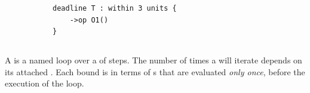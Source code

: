 \begin{figure}[H]
\begin{subfigure}[t]{\egtextwidth}
\begin{lstlisting}[style=Example]
deadline T : within 3 units {
    ->op O1()
}
\end{lstlisting}
\end{subfigure}
\hfill
\begin{subfigure}[t]{\eggraphicalwidth}
  \gsecaption
  \centering
\end{subfigure}
\end{figure}


\subsection{\mloopstep}\label{ssec:metamodel-steps-loop}

\newcommand{\egloopmatrix}{
  \node[rcmodule](mstart) {\egtarget}; \pgfmatrixnextcell \node[world](wstart) {\egworld}; \\
  \coordinate(mls); \pgfmatrixnextcell \coordinate(wls); \\
  \coordinate(mo); \pgfmatrixnextcell \coordinate(wo); \\
  \coordinate(mle); \pgfmatrixnextcell \coordinate(wle); \\
}
\newcommand{\egloopdiagram}[1]{
  \matrix[diagram]{\egloopmatrix};
  \draw[lifeline] (mstart) -- (mls) -- (mo) -- (mle);
  \draw[lifeline] (wstart) -- (wls) -- (wo) -- (wle);
  \draw (mo) edge[oarrow, "O1()"] (wo);
  \gloop{mls}{wls}{mle}{wle}{L}{#1}
}

A \mloopstep{} is a named loop over a \msubsequence{} of steps.
The number of times a \mloopstep{} will iterate 
depends on its attached \mloopbound{}.  Each bound is in terms of
\mexpression{}s that are evaluated \emph{only once}, before the execution
of the loop.

